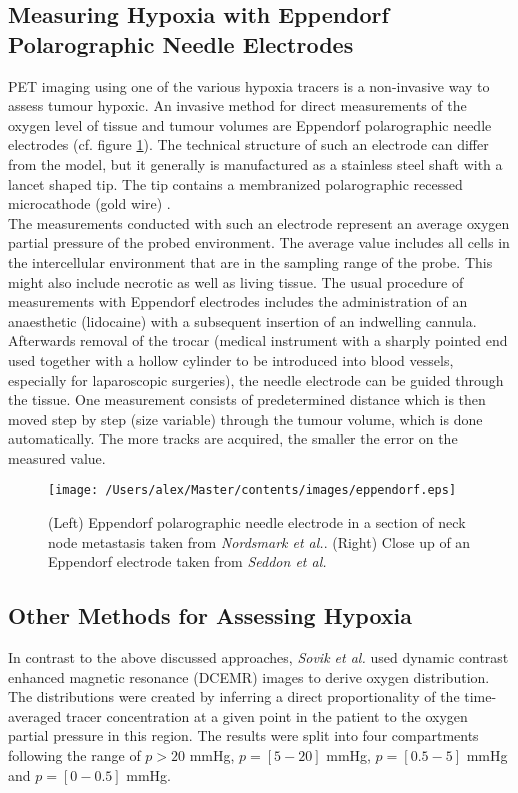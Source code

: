 \subsection[Eppendorf Polarographic Needle Electrodes]{Measuring Hypoxia with Eppendorf Polarographic Needle Electrodes}\label{chap:eppendorf}
PET imaging using one of the various hypoxia tracers is a non-invasive way to assess tumour hypoxic. An invasive method for direct measurements of the oxygen level of tissue and tumour volumes are Eppendorf polarographic needle electrodes (cf. figure \ref{fig:eppendorf}). The technical structure of such an electrode can differ from the model, but it generally is manufactured as a stainless steel shaft with a lancet shaped tip. The tip contains a membranized polarographic recessed microcathode (gold wire) \cite{pmid8018370}.\\The measurements conducted with such an electrode represent an average oxygen partial pressure of the probed environment. The average value includes all cells in the intercellular environment that are in the sampling range of the probe. This might also include necrotic as well as living tissue. The usual procedure of measurements with Eppendorf electrodes includes the administration of an anaesthetic (lidocaine) with a subsequent insertion of an indwelling cannula. Afterwards removal of the trocar (medical instrument with a sharply pointed end used together with a hollow cylinder to be introduced into blood vessels, especially for laparoscopic surgeries), the needle electrode can be guided through the tissue. One measurement consists of predetermined distance which is then moved step by step (size variable) through the tumour volume, which is done automatically. The more tracks are acquired, the smaller the error on the measured value. 
\begin{figure}[t]
\centering
\texttt{[image: /Users/alex/Master/contents/images/eppendorf.eps]}
\vspace{1cm}
\caption{(Left) Eppendorf polarographic needle electrode in a section of neck node metastasis taken from \textit{Nordsmark et al.}\cite{pmid8018370}. (Right) Close up of an Eppendorf electrode taken from \textit{Seddon et al.}\cite{pmid11352767}}
\label{fig:eppendorf}
\end{figure}
\subsection{Other Methods for Assessing Hypoxia}\label{chap:otherhypoxiamethods}
In contrast to the above discussed approaches, \textit{Sovik et al.} \cite{pmid17674980} used dynamic contrast enhanced magnetic resonance (DCEMR) images to derive oxygen distribution. The distributions were created by inferring a direct proportionality of the time-averaged tracer concentration at a given point in the patient to the oxygen partial pressure in this region. The results were split into four compartments following the range of $p>20$ mmHg, $p=[5-20]$ mmHg, $p=[0.5-5]$ mmHg and $p = [0-0.5]$ mmHg.
